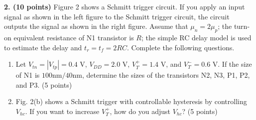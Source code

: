 \documentclass[10pt]{article}
\begin{document}
\textbf{2. (10 points)} Figure 2 shows a Schmitt trigger circuit. If you apply an input signal as shown in the left figure to the Schmitt trigger circuit, the circuit outputs the signal as shown in the right figure. Assume that $\mu_n=2\mu_p$; the turn-on equivalent resistance of N1 transistor is $R$; the simple RC delay model is used to estimate the delay and $t_r=t_f=2RC$. Complete the following questions.
\begin{enumerate}[label=(\alph*),leftmargin=7mm]
\item Let $V_{tn}=|V_{tp}|=0.4$ V, $V_{DD}=2.0$ V, $V_T^+=1.4$ V, and $V_T^-=0.6$ V. If the size of N1 is $100\mathrm{nm}/40\mathrm{nm}$, determine the sizes of the transistors N2, N3, P1, P2, and P3. (5 points)
\item Fig. 2(b) shows a Schmitt trigger with controllable hysteresis by controlling $V_{hc}$. If you want to increase $V_T^+$, how do you adjust $V_{hc}$? (5 points)
\end{enumerate}
\end{document}
